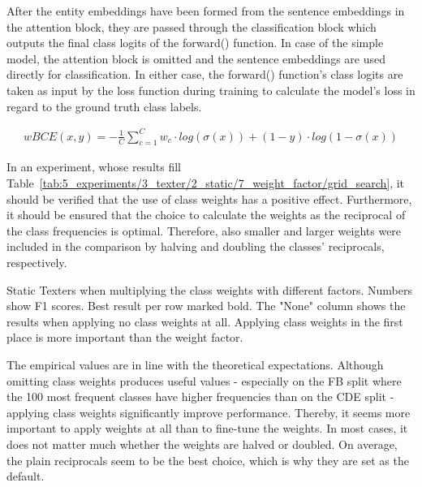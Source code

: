 After the entity embeddings have been formed from the sentence embeddings in the attention block, they are passed through the classification block which outputs the final class logits of the forward() function. In case of the simple model, the attention block is omitted and the sentence embeddings are used directly for classification. In either case, the forward() function's class logits are taken as input by the loss function during training to calculate the model's loss in regard to the ground truth class labels.


\begin{align}
    wBCE(x, y) = - \frac{1}{C} \sum_{c = 1}^C w_c \cdot log(\sigma(x)) + (1 - y) \cdot log(1 - \sigma(x))
    \label{eq:5_experiments/3_texter/2_static/7_weight_factor/wbce}
\end{align}

In an experiment, whose results fill Table~\ref{tab:5_experiments/3_texter/2_static/7_weight_factor/grid_search}, it should be verified that the use of class weights has a positive effect. Furthermore, it should be ensured that the choice to calculate the weights as the reciprocal of the class frequencies is optimal. Therefore, also smaller and larger weights were included in the comparison by halving and doubling the classes' reciprocals, respectively.

\begin{table}[t]
    \centering
    
    \caption{Static Texters when multiplying the class weights with different factors. Numbers show F1 scores. Best result per row marked bold. The "None" column shows the results when applying no class weights at all. Applying class weights in the first place is more important than the weight factor.}
    \label{tab:5_experiments/3_texter/2_static/7_weight_factor/grid_search}
\end{table}

The empirical values are in line with the theoretical expectations. Although omitting class weights produces useful values - especially on the FB split where the 100 most frequent classes have higher frequencies than on the CDE split - applying class weights significantly improve performance. Thereby, it seems more important to apply weights at all than to fine-tune the weights. In most cases, it does not matter much whether the weights are halved or doubled. On average, the plain reciprocals seem to be the best choice, which is why they are set as the default.
